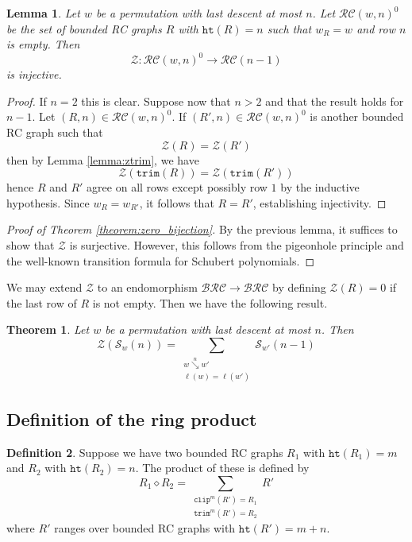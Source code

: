 \documentclass{amsart}
\newtheorem{lemma}{Lemma}[subsection]
\newtheorem{theorem}{Theorem}[section]
\theoremstyle{definition}
\newtheorem{definition}[lemma]{Definition}
\theoremstyle{remark}
\numberwithin{equation}{subsection}
\newcommand{\downvar}[1]{\stackrel{#1}{\searrow}}
\newcommand{\wof}[1]{w_{#1}}
\newcommand{\trm}{\mathtt{trim}}
\newcommand{\zeromap}{\mathcal{Z}}
\newcommand{\hr}{\mathtt{ht}}
\newcommand{\clp}{\mathtt{clip}}
\newcommand{\BRC}{\mathcal{BRC}}
\begin{document}
\begin{lemma} \label{lemma:zero_injective}
Let $w$ be a permutation with last descent at most $n$. Let $\mathcal{RC}(w,n)^0$ be the set of bounded RC graphs $R$ with $\hr(R) = n$ such that $\wof{R}=w$ and row $n$ is empty. Then
$$\zeromap:\mathcal{RC}(w, n)^{0}\to \mathcal{RC}(n-1)$$
is injective.
\end{lemma}
\begin{proof}
If $n=2$ this is clear. Suppose now that $n > 2$ and that the result holds for $n-1$. Let $(R, n)\in \mathcal{RC}(w, n)^0$. If $(R', n)\in\mathcal{RC}(w,n)^0$ is another bounded RC graph such that
$$\zeromap(R) = \zeromap(R')$$
then by Lemma \ref{lemma:ztrim}, we have
$$\zeromap(\trm(R)) = \zeromap(\trm(R'))$$
hence $R$ and $R'$ agree on all rows except possibly row $1$ by the inductive hypothesis. Since $\wof{R} = \wof{R'}$, it follows that $R = R'$, establishing injectivity. 
\end{proof}

\begin{proof}[Proof of Theorem \ref{theorem:zero_bijection}]
By the previous lemma, it suffices to show that $\zeromap$ is surjective. However, this follows from the pigeonhole principle and the well-known transition formula for Schubert polynomials.
\end{proof}


We may extend $\zeromap$ to an endomorphism $\BRC\to\BRC$ by defining $\zeromap(R) = 0$ if the last row of $R$ is not empty. Then we have the following result.

\begin{theorem} \label{theorem:transition}
	Let $w$ be a permutation with last descent at most $n$. Then
	$$\zeromap(\mathcal{S}_w(n))=\sum_{\substack{w\downvar{n} w'\\\ell(w)=\ell(w')}}\mathcal{S}_{w'}(n-1)$$
\end{theorem} 





\subsection{Definition of the ring product}

\begin{definition}
Suppose we have two bounded RC graphs $R_1$ with $\hr(R_1)=m$ and $R_2$ with $\hr(R_2)=n$. The product of these is defined by
$$R_1\diamond R_2 = \sum_{\substack{\clp^m(R')=R_1\\\trm^m(R')=R_2}}R'$$  
where $R'$ ranges over bounded RC graphs with $\hr(R')=m+n$.
\end{definition}
\end{document}
